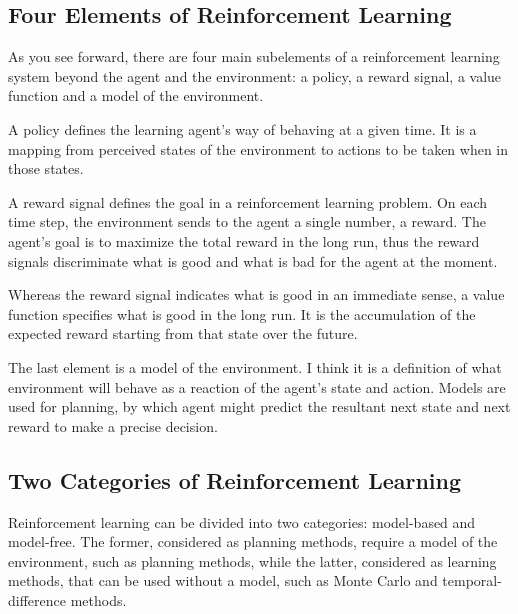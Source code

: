 \documentclass[10pt,twocolumn,letterpaper]{article}
\begin{document}
\subsection{Four Elements of Reinforcement Learning}

As you see forward, there are four main subelements of a reinforcement learning system beyond the agent
and the environment: a policy, a reward signal, a value function and a model of the environment.

A policy defines the learning agent's way of behaving at a given time. It is a mapping from perceived states of
the environment to actions to be taken when in those states.

 A reward signal defines the goal in a reinforcement learning problem. On each time step, the environment sends
 to the agent a single number, a reward. The agent's goal is to maximize the total reward in the long run, thus the
 reward signals discriminate what is good and what is bad for the agent at the moment.
 
 Whereas the reward signal indicates what is good in an immediate sense, a value function specifies what is good 
 in the long run. It is the accumulation of the expected reward starting from that state over the future.
 
 The last element is a model of the environment. I think it is a definition of what environment will behave as a reaction
 of the agent's state and action. Models are used for planning, by which agent might predict the resultant next state and
 next reward to make a precise decision. 
 
\subsection{Two Categories of Reinforcement Learning}

Reinforcement learning can be divided into two categories: model-based and model-free. The former, considered as 
planning methods, require a model of the environment, such as planning methods, while the latter, considered as learning
methods, that can be used without a  model, such as Monte Carlo and temporal-difference methods\cite{ref0}.  
\end{document}
